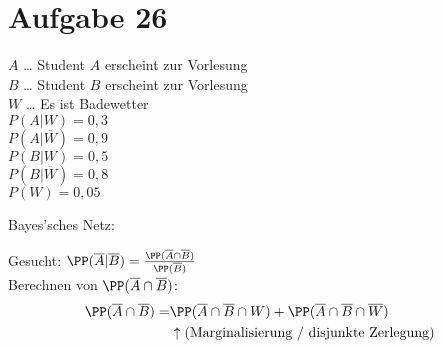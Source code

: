 \documentclass{scrreprt}
\begin{document}
\section{Aufgabe 26}
$A$ … Student $A$ erscheint zur Vorlesung\\
$B$ … Student $B$ erscheint zur Vorlesung\\
$W$ … Es ist Badewetter\\
$P(A|W)=0,3$\\
$P(A|\overline{W})=0,9$\\
$P(B|W)=0,5$\\
$P(B|\overline{W})=0,8$\\
$P(W)=0,05$
\begin{anumerate}
\item Bayes'sches Netz:
\begin{center}
\end{center}
\item Gesucht: $\PP(\overline{A}|\overline{B})=\frac{\PP(\overline{A}\cap \overline{B})}{\PP(\overline{B})}$\\
Berechnen von $\PP(\overline{A}\cap \overline{B})$:
\begin{align*}
\PP(\overline{A}\cap \overline{B}) =& \PP(\overline{A}\cap \overline{B}\cap W) + \PP(\overline{A}\cap \overline{B}\cap \overline{W})\\
&\uparrow\text{(Marginalisierung / disjunkte Zerlegung)}\\

\end{align*}
\end{anumerate}
\end{document}
